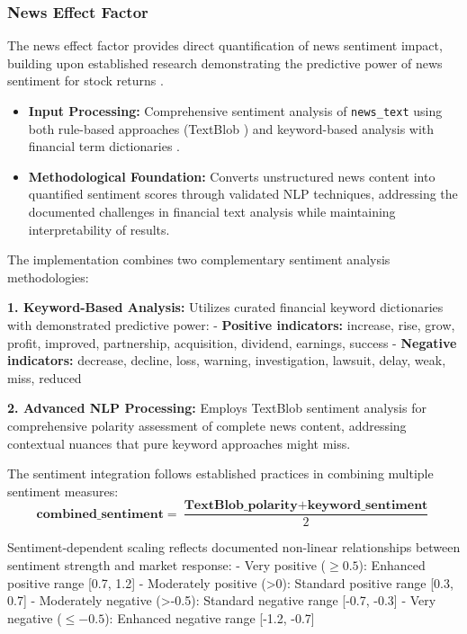 \documentclass[3p,times,procedia]{elsarticle}
\begin{document}
\subsubsection{{News Effect Factor}}

The news effect factor provides direct quantification of news sentiment impact, building upon established research demonstrating the predictive power of news sentiment for stock returns \cite{TETLOCK2007,Schumaker2009}.

\begin{itemize}
    \item \textbf{Input Processing:} Comprehensive sentiment analysis of \texttt{news\_text} using both rule-based approaches (TextBlob \cite{Loria2019}) and keyword-based analysis with financial term dictionaries \cite{Loughran2011}.
    \item \textbf{Methodological Foundation:} Converts unstructured news content into quantified sentiment scores through validated NLP techniques, addressing the documented challenges in financial text analysis while maintaining interpretability of results.
\end{itemize}

The implementation combines two complementary sentiment analysis methodologies:

\textbf{1. Keyword-Based Analysis:} Utilizes curated financial keyword dictionaries with demonstrated predictive power:
- \textbf{Positive indicators:} increase, rise, grow, profit, improved, partnership, acquisition, dividend, earnings, success
- \textbf{Negative indicators:} decrease, decline, loss, warning, investigation, lawsuit, delay, weak, miss, reduced

\textbf{2. Advanced NLP Processing:} Employs TextBlob sentiment analysis for comprehensive polarity assessment of complete news content, addressing contextual nuances that pure keyword approaches might miss.

The sentiment integration follows established practices in combining multiple sentiment measures:
\begin{equation}
\textbf{combined\_sentiment} = \frac{\textbf{TextBlob\_polarity} + \textbf{keyword\_sentiment}}{2}
\end{equation}

Sentiment-dependent scaling reflects documented non-linear relationships between sentiment strength and market response:
- Very positive ($\geq 0.5$): Enhanced positive range [0.7, 1.2] 
- Moderately positive (>0): Standard positive range [0.3, 0.7]
- Moderately negative (>-0.5): Standard negative range [-0.7, -0.3]  
- Very negative ($\leq -0.5$): Enhanced negative range [-1.2, -0.7]
\end{document}
